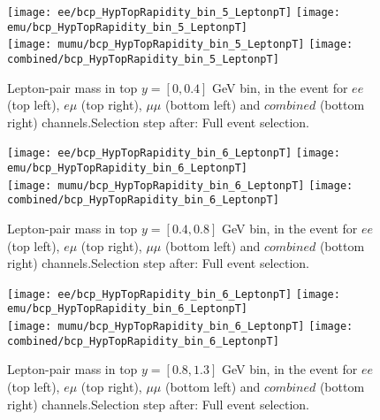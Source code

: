 \clearpage
\newpage


\begin{figure}
  \texttt{[image: ee/bcp\_HypTopRapidity\_bin\_5\_LeptonpT]}
  \texttt{[image: emu/bcp\_HypTopRapidity\_bin\_5\_LeptonpT]}\\
  \texttt{[image: mumu/bcp\_HypTopRapidity\_bin\_5\_LeptonpT]}
  \texttt{[image: combined/bcp\_HypTopRapidity\_bin\_5\_LeptonpT]}
\caption{Lepton-pair mass in top $y = [0,0.4]$ GeV bin, in the event for $ee$ (top left), $e\mu$ (top right), $\mu\mu$ (bottom left) and $combined$ (bottom right) channels.\newline Selection step after: Full event selection.}
\end{figure}

\clearpage
\newpage

\begin{figure}
  \texttt{[image: ee/bcp\_HypTopRapidity\_bin\_6\_LeptonpT]}
  \texttt{[image: emu/bcp\_HypTopRapidity\_bin\_6\_LeptonpT]}\\
  \texttt{[image: mumu/bcp\_HypTopRapidity\_bin\_6\_LeptonpT]}
  \texttt{[image: combined/bcp\_HypTopRapidity\_bin\_6\_LeptonpT]}
\caption{Lepton-pair mass in top $y = [0.4,0.8]$ GeV bin, in the event for $ee$ (top left), $e\mu$ (top right), $\mu\mu$ (bottom left) and $combined$ (bottom right) channels.\newline Selection step after: Full event selection.}
\end{figure}

\clearpage
\newpage
\begin{figure}
  \texttt{[image: ee/bcp\_HypTopRapidity\_bin\_6\_LeptonpT]}
  \texttt{[image: emu/bcp\_HypTopRapidity\_bin\_6\_LeptonpT]}\\
  \texttt{[image: mumu/bcp\_HypTopRapidity\_bin\_6\_LeptonpT]}
  \texttt{[image: combined/bcp\_HypTopRapidity\_bin\_6\_LeptonpT]}
\caption{Lepton-pair mass in top $y = [0.8,1.3]$ GeV bin, in the event for $ee$ (top left), $e\mu$ (top right), $\mu\mu$ (bottom left) and $combined$ (bottom right) channels.\newline Selection step after: Full event selection.}
\end{figure}

